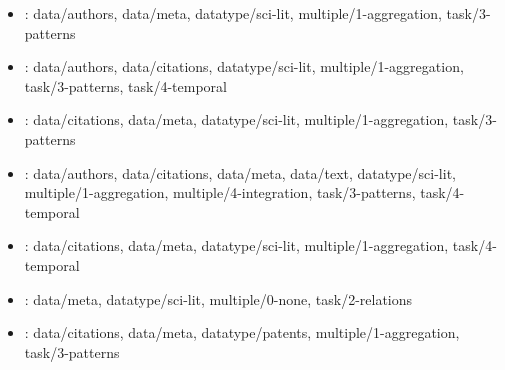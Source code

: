 \begin {refsection}
\begin {itemize}
\item \cite {alper-2011-design-study-of-linesets-a-novel-set-visualization}:
    data/authors, data/meta, datatype/sci-lit, multiple/1-aggregation, task/3-patterns


\item \cite {white-1998-visualizing-a-discipline:-an-author-co-citation-analysis}:
    data/authors, data/citations, datatype/sci-lit, multiple/1-aggregation, task/3-patterns, task/4-temporal


\item \cite {rosvall-2011-multilevel-compression-of-random-walks-on-networks}:
    data/citations, data/meta, datatype/sci-lit, multiple/1-aggregation, task/3-patterns


\item \cite {heimerl-2016-citerivers:-visual-analysis-of-citation-patterns}:
    data/authors, data/citations, data/meta, data/text, datatype/sci-lit, multiple/1-aggregation, multiple/4-integration, task/3-patterns, task/4-temporal


\item \cite {herr-ii-2008-113-years-of-physical-review:-using-flow}:
    data/citations, data/meta, datatype/sci-lit, multiple/1-aggregation, task/4-temporal


\item \cite {alsallakh-2013-radial-sets:-interactive-visual-analysis}:
    data/meta, datatype/sci-lit, multiple/0-none, task/2-relations


\item \cite {li-2007-patent-citation-network-in-nanotechnology-1976}:
    data/citations, data/meta, datatype/patents, multiple/1-aggregation, task/3-patterns


\end {itemize}
\printbibliography
\end {refsection}\pagebreak

